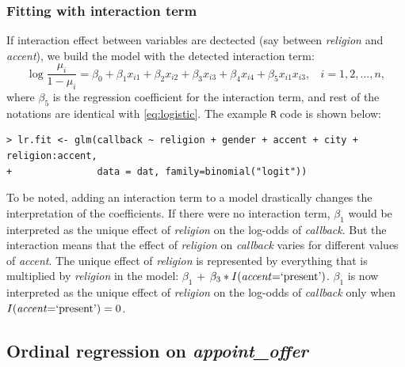 \documentclass[11pt]{article}
\begin{document}
\subsubsection{Fitting with interaction term}
If interaction effect between variables are dectected (say between \textit{religion} and \textit{accent}), we build the model with the detected interaction term:
\begin{equation}
    \log \frac{\mu_i}{1-\mu_i}  = \beta_0 + \beta_1x_{i1} + \beta_2x_{i2} + \beta_3x_{i3} + \beta_4x_{i4} + \beta_5 x_{i1}x_{i3},\ \ \ \ i=1,2,...,n,
    \label{eq:logistic2}
\end{equation}
where $\beta_5$ is the regression coefficient for the interaction term, and rest of the notations are identical with \autoref{eq:logistic}. The example \texttt{R} code is shown below:
\begin{verbatim}
> lr.fit <- glm(callback ~ religion + gender + accent + city + religion:accent, 
+               data = dat, family=binomial("logit"))  
\end{verbatim}

To be noted, adding an interaction term to a model drastically changes the interpretation of the coefficients. If there were no interaction term, $\beta_1$ would be interpreted as the unique effect of \textit{religion} on the log-odds of \textit{callback}. But the interaction means that the effect of \textit{religion} on \textit{callback} varies for different values of \textit{accent}. The unique effect of \textit{religion} is represented by everything that is multiplied by \textit{religion} in the model: $\beta_1$ + $\beta_3*I\textnormal{(\textit{accent}=`present')}$. $\beta_1$ is now interpreted as the unique effect of \textit{religion} on the log-odds of \textit{callback} only when $I\textnormal{(\textit{accent}=`present')}=0$.


\subsection{Ordinal regression on \textit{appoint\_offer}}
\end{document}
